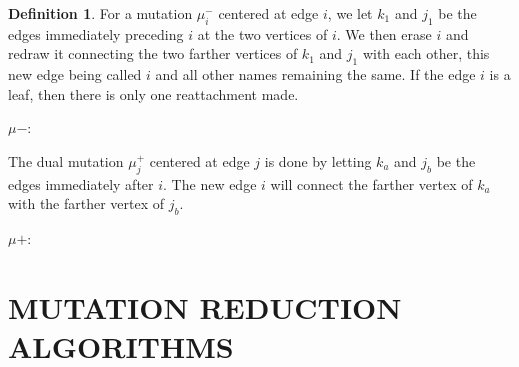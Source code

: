 \documentclass[11pt,english]{article}
\numberwithin{figure}{section}
\numberwithin{equation}{section}
\numberwithin{table}{section}
\theoremstyle{definition}
\newtheorem{defn}{Definition}[section]
\theoremstyle{remark}
\begin{document}
\begin{defn} For a mutation $\mu_i^-$ centered at edge $i$, we let $k_1$ and $j_1$ be the edges immediately preceding $i$ at the two vertices of $i$. We then erase $i$ and redraw it connecting the two farther vertices of $k_1$ and $j_1$ with each other, this new edge being called $i$ and all other names remaining the same. If the edge $i$ is a leaf,  then there is only one reattachment made.

	
$\mu-:$



The dual mutation  $\mu_j^+$ centered at edge $j$ is done by letting $k_a$ and $j_b$ be the edges immediately after $i$. The new edge $i$ will connect the farther vertex of $k_a$ with the farther vertex of $j_b$.

$\mu+:$


\end{defn}


\section{MUTATION REDUCTION ALGORITHMS}
\end{document}
